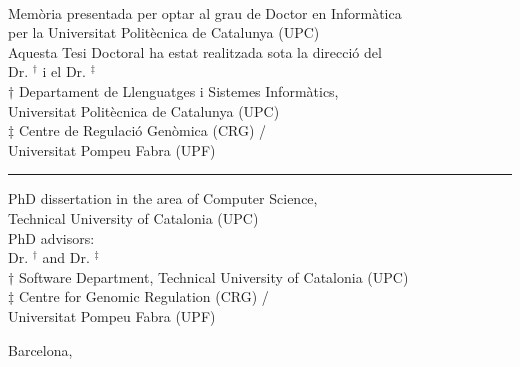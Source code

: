 
\thispagestyle{empty}


\begin{figure}[!ht]
 \begin{center}
 \end{center}
\end{figure}

\vfill%

\begin{center}
{\avantgarboldHuge\mytitle\vfill}
\end{center}

\vfill\vfill\vspace{0.5cm}


\begin{center}
{\avantgarboldLarge\thyauthor}\\[3cm]
{\small\textsf
Mem\`{o}ria presentada per optar al grau de Doctor en Inform\`atica\\
per la Universitat Polit\`ecnica de Catalunya (UPC)\\[2ex]

Aquesta Tesi Doctoral ha estat realitzada sota la direcci\'{o} del\\
Dr. \textbf{\thyadvisor}$^\dagger$ i el Dr. \textbf{\thyadvisordue}$^\ddagger$\\[2ex]

$\dagger$ Departament de Llenguatges i Sistemes Inform\`atics,\\ 
Universitat Polit\`ecnica de Catalunya (UPC)\\
$\ddagger$ Centre de Regulaci\'o Gen\`omica (CRG) / \\
Universitat Pompeu Fabra (UPF)
}

\vspace{0.25cm}
\hrule
\vspace{0.25cm}

{\small\textsf
PhD dissertation in the area of Computer Science,\\
Technical University of Catalonia (UPC)\\[2ex]

PhD advisors:\\ Dr. \textbf{\thyadvisor}$^\dagger$ and Dr. \textbf{\thyadvisordue}$^\ddagger$\\[2ex]

$\dagger$ Software Department, Technical University of Catalonia (UPC)\\ 
$\ddagger$ Centre for Genomic Regulation (CRG) / \\
Universitat Pompeu Fabra (UPF)

}

\end{center}


\vspace{.5cm}

\begin{center}
 {\avantgar Barcelona, \thydate}
\end{center}
